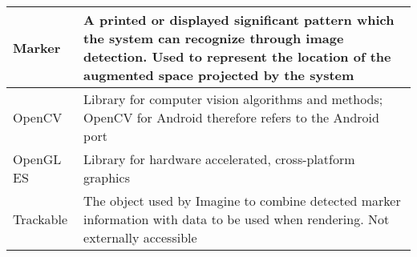 \begin{tabulary}{\textwidth}{p{2.5cm}|L}
    Marker            & A printed or displayed significant pattern which the system can recognize through image detection. Used to represent the location of the augmented space projected by the system       \\ \hline
    OpenCV            & Library for computer vision algorithms and methods; OpenCV for Android therefore refers to the Android port                                                                            \\ \hline
    OpenGL ES         & Library for hardware accelerated, cross-platform graphics                                                                                                                              \\ \hline
    Trackable         & The object used by Imagine to combine detected marker information with data to be used when rendering. Not externally accessible                                                       \\
\end{tabulary}
